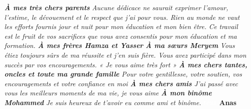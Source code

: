 \thispagestyle{plain}
\begin{large}
\begin{center}
\centering

\noindent\textit{
    \textbf{À mes très chers parents}
    \newline
    Aucune dédicace ne saurait exprimer l’amour, l’estime, le dévouement et le
    respect que j’ai pour vous.
    \newline
    Rien au monde ne vaut les efforts fournis jour et nuit pour mon éducation et
    mon bien être.
    \newline
    Ce travail est le fruit de vos sacrifices que vous avez consentis pour mon éducation et
    ma formation.
    \newline
    \newline
    \textbf{À mes frères Hamza et Yasser}
    \newline
    \textbf{À ma sœurs Meryem}
    \newline
    Vous étiez toujours sûrs de ma réussite et j’en suis fière.
    \newline
    Vous avez participé dans mon succès par vos encouragements.
    \newline
    « Je vous aime très fort »
    \newline
    \newline
    \textbf{À mes chers tantes, oncles et toute ma grande famille}
    \newline
    Pour votre gentillesse, votre soutien, vos encouragements et votre confiance en moi
    \newline
    \newline
    \textbf{À mes chers amis}
    \newline
    J’ai passé avec vous les meilleurs moments de ma vie, je vous aime
    \newline
    \newline
    \textbf{À mon binôme Mohammed}
    \newline
    Je suis heureux de t’avoir eu comme ami et binôme.
    \newline
}
\newline
\raggedleft\textbf{\textcolor{white}{text}}
\hfill \textbf{Anas}
\end{center}
\end{large}